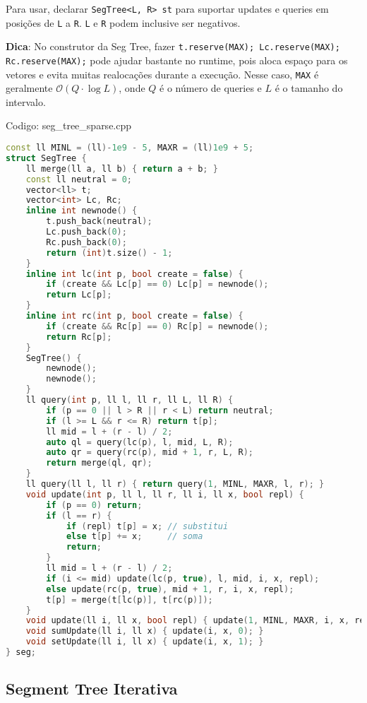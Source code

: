 \documentclass[10pt, a4paper, oneside]{book}
\begin{document}
Para usar, declarar \texttt{SegTree<L, R> st} para suportar updates e queries em posições de \texttt{L} a \texttt{R}. \texttt{L} e \texttt{R} podem inclusive ser negativos.



\textbf{Dica}: No construtor da Seg Tree, fazer \texttt{t.reserve(MAX); Lc.reserve(MAX); Rc.reserve(MAX);} pode ajudar bastante no runtime, pois aloca espaço para os vetores e evita muitas realocações durante a execução. Nesse caso, \texttt{MAX} é geralmente $\mathcal{O}(Q \cdot \log L)$, onde $Q$ é o número de queries e $L$ é o tamanho do intervalo.
\hfill

Codigo: seg\_tree\_sparse.cpp

\begin{lstlisting}[language=C++]
const ll MINL = (ll)-1e9 - 5, MAXR = (ll)1e9 + 5;
struct SegTree {
    ll merge(ll a, ll b) { return a + b; }
    const ll neutral = 0;
    vector<ll> t;
    vector<int> Lc, Rc;
    inline int newnode() {
        t.push_back(neutral);
        Lc.push_back(0);
        Rc.push_back(0);
        return (int)t.size() - 1;
    }
    inline int lc(int p, bool create = false) {
        if (create && Lc[p] == 0) Lc[p] = newnode();
        return Lc[p];
    }
    inline int rc(int p, bool create = false) {
        if (create && Rc[p] == 0) Rc[p] = newnode();
        return Rc[p];
    }
    SegTree() {
        newnode();
        newnode();
    }
    ll query(int p, ll l, ll r, ll L, ll R) {
        if (p == 0 || l > R || r < L) return neutral;
        if (l >= L && r <= R) return t[p];
        ll mid = l + (r - l) / 2;
        auto ql = query(lc(p), l, mid, L, R);
        auto qr = query(rc(p), mid + 1, r, L, R);
        return merge(ql, qr);
    }
    ll query(ll l, ll r) { return query(1, MINL, MAXR, l, r); }
    void update(int p, ll l, ll r, ll i, ll x, bool repl) {
        if (p == 0) return;
        if (l == r) {
            if (repl) t[p] = x; // substitui
            else t[p] += x;     // soma
            return;
        }
        ll mid = l + (r - l) / 2;
        if (i <= mid) update(lc(p, true), l, mid, i, x, repl);
        else update(rc(p, true), mid + 1, r, i, x, repl);
        t[p] = merge(t[lc(p)], t[rc(p)]);
    }
    void update(ll i, ll x, bool repl) { update(1, MINL, MAXR, i, x, repl); }
    void sumUpdate(ll i, ll x) { update(i, x, 0); }
    void setUpdate(ll i, ll x) { update(i, x, 1); }
} seg;
\end{lstlisting}
\hfill

\subsection{Segment Tree Iterativa}
\end{document}
